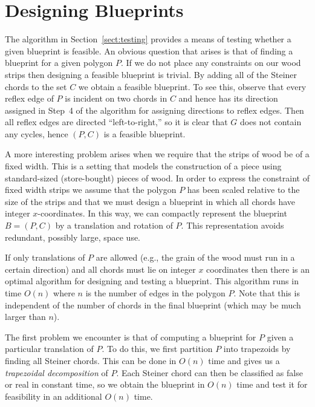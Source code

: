 \documentclass{elsart}
\begin{document}
\section{Designing Blueprints}
\label{sect:design}

The algorithm in Section~\ref{sect:testing} provides a means of
testing whether a given blueprint is feasible.  An obvious question
that arises is that of finding a blueprint for a given polygon $P$.
If we do not place any constraints on our wood strips then designing a
feasible blueprint is trivial.  By adding all of the Steiner chords to
the set $C$ we obtain a feasible blueprint.  To see this, observe that
every reflex edge of $P$ is incident on two chords in $C$ and hence
has its direction assigned in Step~4 of the algorithm for assigning
directions to reflex edges.  Then all reflex edges are directed
``left-to-right,'' so it is clear that $G$ does not contain any
cycles, hence $(P,C)$ is a feasible blueprint.

A more interesting problem arises when we require that the strips of
wood be of a fixed width.  This is a setting that models the
construction of a piece using standard-sized (store-bought) pieces of
wood.  In order to express the constraint of fixed width strips we
assume that the polygon $P$ has been scaled relative to the size of
the strips and that we must design a blueprint in which all chords
have integer $x$-coordinates.  In this way, we can compactly represent
the blueprint $B=(P,C)$ by a translation and rotation of $P$.  This
representation avoids redundant, possibly large, space use.

If only translations of $P$ are allowed (e.g., the grain of the wood
must run in a certain direction) and all chords must lie on integer
$x$ coordinates then there is an optimal algorithm for designing and
testing a blueprint.  This algorithm runs in time $O(n)$ where $n$ is
the number of edges in the polygon $P$.  Note that this is independent
of the number of chords in the final blueprint (which may be much
larger than $n$).

The first problem we encounter is that of computing a blueprint for
$P$ given a particular translation of $P$.  To do this, we first
partition $P$ into trapezoids by finding all Steiner chords.  This can
be done in $O(n)$ time \cite{c91} and gives us a \emph{trapezoidal
decomposition} of $P$.  Each Steiner chord can then be classified as
false or real in constant time, so we obtain the blueprint in $O(n)$
time and test it for feasibility in an additional $O(n)$ time.
\end{document}
